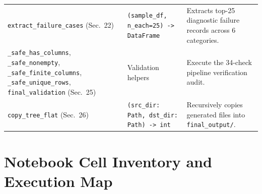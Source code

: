 \documentclass[11pt,a4paper]{article}
\begin{document}
\begin{small}
\begin{longtable}{L{0.29\textwidth} L{0.26\textwidth} L{0.36\textwidth}}
\texttt{extract\_\allowbreak{}failure\_\allowbreak{}cases} (Sec.~22) & \texttt{(\allowbreak{}sample\_\allowbreak{}df,\allowbreak{} n\_\allowbreak{}each=25) -> DataFrame} & Extracts top-25 diagnostic failure records across 6 categories. \\
\texttt{\_\allowbreak{}safe\_\allowbreak{}has\_\allowbreak{}columns}, \texttt{\_\allowbreak{}safe\_\allowbreak{}nonempty}, \texttt{\_\allowbreak{}safe\_\allowbreak{}finite\_\allowbreak{}columns}, \texttt{\_\allowbreak{}safe\_\allowbreak{}unique\_\allowbreak{}rows}, \texttt{final\_\allowbreak{}validation} (Sec.~25) & Validation helpers & Execute the 34-check pipeline verification audit. \\
\texttt{copy\_\allowbreak{}tree\_\allowbreak{}flat} (Sec.~26) & \texttt{(\allowbreak{}src\_\allowbreak{}dir: Path,\allowbreak{} dst\_\allowbreak{}dir: Path) -> int} & Recursively copies generated files into \texttt{final\_\allowbreak{}output/\allowbreak{}}. \\
\end{longtable}
\end{small}

\section{Notebook Cell Inventory and Execution Map}
\end{document}

